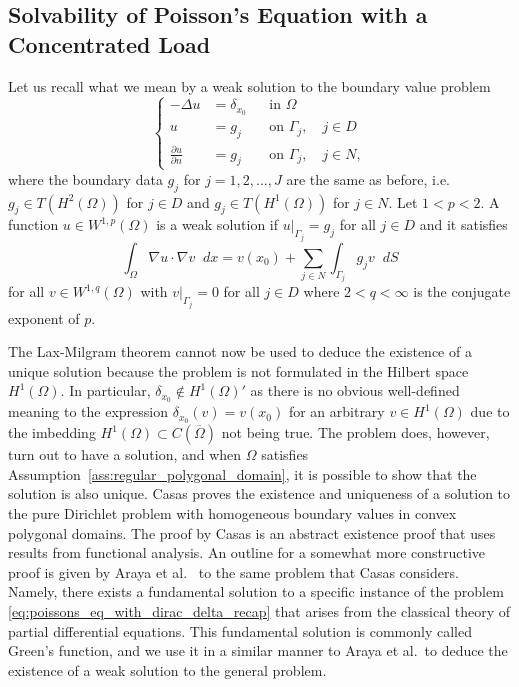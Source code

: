 \documentclass[english, 12pt, a4paper, sci, utf8, a-2b, online]{aaltothesis}
\theoremstyle{definition}
\theoremstyle{plain}
\newcommand*\diff{\mathop{}\!d}
\numberwithin{equation}{section}
\begin{document}
\subsection{Solvability of Poisson's Equation with a Concentrated Load}
\label{subsec:poissons_equation_with_a_concentrated_load}

Let us recall what we mean by a weak solution to the boundary value problem
\begin{equation}
    \label{eq:poissons_eq_with_dirac_delta_recap}
    \left\{
        \begin{aligned}
            -\Delta u &= \delta_{x_0} && \text{in } \Omega \\
            u &= g_j && \text{on } \Gamma_j, \quad j \in D \\
            \frac{\partial u}{\partial n} &= g_j && \text{on } \Gamma_j,
            \quad j \in N,
        \end{aligned}
    \right.
\end{equation}
where the boundary data $g_j$ for $j=1,2,\dotsc,J$ are the same as before,
i.e.\ $g_j \in T(H^2(\Omega))$ for $j \in D$ and
$g_j \in T(H^1(\Omega))$ for $j \in N$. Let $1 < p < 2$.
A function $u \in W^{1,p}(\Omega)$ is a weak solution
if $u|_{\Gamma_j} = g_j$ for all $j \in D$ and it satisfies
\begin{equation*}
    \int_{\Omega} \nabla u \cdot \nabla v \diff x
    = v(x_0) + \sum_{j \in N} \int_{\Gamma_j} g_j v \diff S
\end{equation*}
for all $v \in W^{1,q}(\Omega)$ with $v|_{\Gamma_j} = 0$ for all $j \in D$
where $2 < q < \infty$ is the conjugate exponent of $p$.

The Lax-Milgram theorem cannot now be used to deduce the existence of a unique
solution because the problem is not formulated in the Hilbert space $H^1(\Omega)$.
In particular, $\delta_{x_0} \notin H^1(\Omega)'$ as there is no obvious
well-defined meaning to the expression $\delta_{x_0}(v) = v(x_0)$ for
an arbitrary $v \in H^1(\Omega)$ due to the imbedding
$H^1(\Omega) \subset C(\overline{\Omega})$ not being true.
The problem does, however, turn out to have a solution,
and when $\Omega$ satisfies Assumption~\ref{ass:regular_polygonal_domain},
it is possible to show that the solution is also unique.
Casas \cite{casas1985} proves the existence and uniqueness of
a solution to the pure Dirichlet problem with homogeneous boundary
values in convex polygonal domains. The proof by Casas is an abstract
existence proof that uses results from functional analysis.
An outline for a somewhat more constructive proof is given by
Araya et al.\ \cite{arayabehrens2006} to the same problem that Casas considers.
Namely, there exists a fundamental solution to a specific instance of
the problem \eqref{eq:poissons_eq_with_dirac_delta_recap} that arises from the
classical theory of partial differential equations.
This fundamental solution is commonly called Green's function,
and we use it in a similar manner to Araya et al.\ to deduce
the existence of a weak solution to the general problem.
\end{document}
